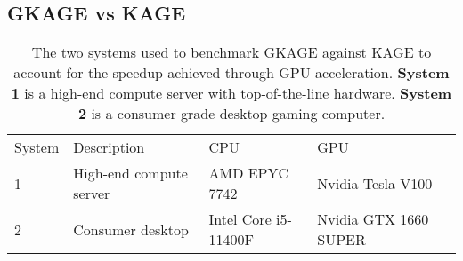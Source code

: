 \subsection{GKAGE vs KAGE} \label{results:gkage_vs_kage}

\begin{table}[H]
\begin{tabular}{lllll}
\cline{1-4}
\multicolumn{1}{|l|}{System} & \multicolumn{1}{l|}{Description}               & \multicolumn{1}{l|}{CPU}                  & \multicolumn{1}{l|}{GPU}                   &  \\ \cline{1-4}
\multicolumn{1}{|l|}{1}      & \multicolumn{1}{l|}{High-end compute server}   & \multicolumn{1}{l|}{AMD EPYC 7742}        & \multicolumn{1}{l|}{Nvidia Tesla V100}     &  \\ \cline{1-4}
\multicolumn{1}{|l|}{2}      & \multicolumn{1}{l|}{Consumer desktop} & \multicolumn{1}{l|}{Intel Core i5-11400F} & \multicolumn{1}{l|}{Nvidia GTX 1660 SUPER} &  \\ \cline{1-4}
\end{tabular}
\caption{
  The two systems used to benchmark GKAGE against KAGE to account for the speedup achieved through GPU acceleration.
  \textbf{System 1} is a high-end compute server with top-of-the-line hardware.
  \textbf{System 2} is a consumer grade desktop gaming computer.
}
\label{results:gkage_vs_kage:tables:systems}
\end{table}
